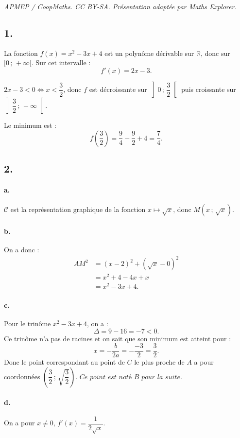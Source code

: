 \documentclass[10pt]{article}
\begin{document}
\noindent\textit{APMEP / CoopMaths. CC BY-SA. Présentation adaptée par Maths Explorer.}\par\medskip
\subsection*{1.}

La fonction \( f(x) = x^2 - 3x + 4 \) est un polynôme dérivable sur \( \mathbb{R} \), donc sur \( [0\,;\,+\infty[ \). Sur cet intervalle :
\[
f'(x) = 2x - 3.
\]

\(2x - 3 < 0 \iff x < \dfrac{3}{2}\), donc \(f\) est décroissante sur \( \left]0\,;\,\dfrac{3}{2} \right[\) puis croissante sur \( \left]\dfrac{3}{2}\,;\,+\infty \right[ \).

Le minimum est :
\[
f\left(\dfrac{3}{2}\right) = \dfrac{9}{4} - \dfrac{9}{2} + 4 = \dfrac{7}{4}.
\]

\subsection*{2.}

\paragraph{a.} \(\mathcal{C}\) est la représentation graphique de la fonction \(x \longmapsto \sqrt{x}\), donc \( M(x \,;\, \sqrt{x}) \).

\paragraph{b.} On a donc :
\begin{align*}
AM^2 &= (x - 2)^2 + (\sqrt{x} - 0)^2 \\
&= x^2 + 4 - 4x + x \\
&= x^2 - 3x + 4.
\end{align*}

\paragraph{c.} Pour le trinôme \(x^2 - 3x + 4\), on a :
\[
\Delta = 9 - 16 = -7 < 0.
\]
Ce trinôme n'a pas de racines et on sait que son minimum est atteint pour :
\[
x = -\dfrac{b}{2a} = -\dfrac{-3}{2} = \dfrac{3}{2}.
\]
Donc le point correspondant au point de \(C\) le plus proche de \(A\) a pour coordonnées \( \left( \dfrac{3}{2} \,;\, \sqrt{\dfrac{3}{2}} \right).  \textit{ Ce point est noté } B \textit{ pour la suite}\).

\paragraph{d.} On a pour \(x \neq 0\), \(f'(x) = \dfrac{1}{2\sqrt{x}}\).
\end{document}
